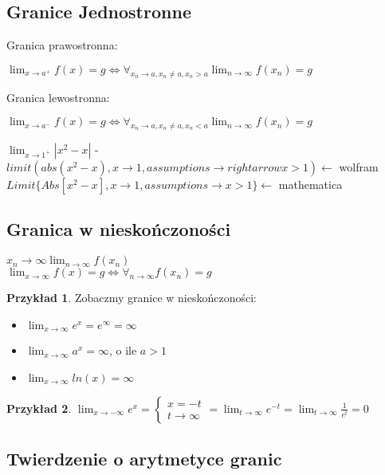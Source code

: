 \documentclass{article}
\theoremstyle{definition}
\theoremstyle{definition}
\theoremstyle{definition}
\newtheorem{pk}{Przykład}[subsection]
\theoremstyle{definition}
\begin{document}
\subsection{Granice Jednostronne}

Granica prawostronna:
\begin{center}
    $\lim_{x\rightarrow a^{+}} f(x)=g \iff \forall_{x_n\rightarrow a, x_n\neq a, x_n>a} \lim_{n\rightarrow \infty} f(x_n)=g$
\end{center}
Granica lewostronna:
\begin{center}
    $\lim_{x\rightarrow a^{-}} f(x)=g \iff \forall_{x_n\rightarrow a, x_n\neq a, x_n<a} \lim_{n\rightarrow \infty} f(x_n)=g$
\end{center}
$\lim_{x\rightarrow 1^{+}} |x^2-x|$ - $limit(abs(x^2-x),x\rightarrow 1,assumptions\rightarrow rightarrow x>1)\leftarrow$ wolfram\\
$Limit\{Abs[x^2-x],x\rightarrow 1, assumptions\rightarrow x>1\}\leftarrow$ mathematica

\subsection{Granica w nieskończoności}

$x_n\rightarrow \infty \lim_{n\rightarrow \infty} f(x_n)$\\
$\lim_{x\rightarrow \infty} f(x)=g \iff \forall_{n\rightarrow \infty} f(x_n)=g$

\begin{pk}
    Zobaczmy granice w nieskończoności:
    \begin{itemize}
        \item $\lim_{x\rightarrow \infty} e^x = e^{\infty} = \infty$
        \item $\lim_{x\rightarrow \infty} a^x = \infty$, o ile $a>1$
        \item $\lim_{x\rightarrow \infty} ln(x) = \infty$
    \end{itemize}
\end{pk}

\begin{pk}
    $\lim_{x\rightarrow -\infty} e^x = \begin{cases}
        x=-t\\
        t\rightarrow \infty
    \end{cases}=
    \lim_{t\rightarrow \infty} e^{-t} = \lim_{t\rightarrow \infty} \frac{1}{e^t} = 0
    $
\end{pk}

\subsection{Twierdzenie o arytmetyce granic}
\end{document}
